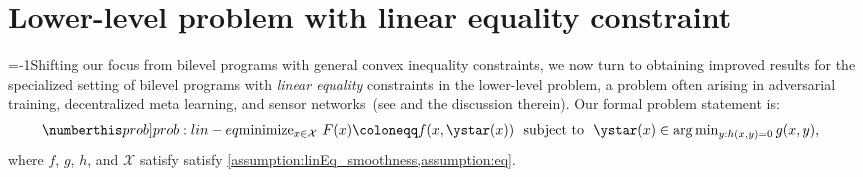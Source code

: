\section{Lower-level problem with linear equality constraint}\label{sec:equality-bilevel}
\looseness=-1Shifting our focus from bilevel programs with general convex inequality constraints, we now turn to obtaining improved results for the specialized setting of bilevel programs with  \textit{linear equality }constraints in the lower-level problem, a problem often arising in adversarial training, decentralized meta learning, and sensor networks~(see \cite{khanduri2023linearly} and the discussion therein). Our formal problem statement is:   
\begin{align*}\numberthis\label[prob]{prob:lin-eq}
     & \mbox{minimize}_{x\in \mathcal{X}} ~ F(x) \coloneqq f(x, \ystar(x))~\text{ subject to } ~\ystar(x)\in \arg\min\nolimits_{y: h(x, y) = 0} g(x, y), 
\end{align*}
where $f$, $g$, $h$, and $\mathcal{X}$ satisfy
satisfy 
\cref{assumption:linEq_smoothness,assumption:eq}.

